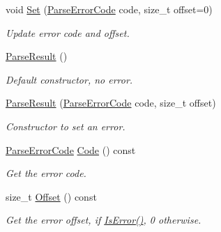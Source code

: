 \begin{DoxyCompactItemize}
void \hyperlink{structParseResult_aa81b4a7b776b77216cb752385203a8c1}{Set} (\hyperlink{group__RAPIDJSON__ERRORS_ga8d4b32dfc45840bca189ade2bbcb6ba7}{Parse\+Error\+Code} code, size\+\_\+t offset=0)
\begin{DoxyCompactList}\small\item\em Update error code and offset. \end{DoxyCompactList}\item 
\mbox{\label{structParseResult_acd4a266f815bec59fa27f64f1923fe9e}} 
\hyperlink{structParseResult_acd4a266f815bec59fa27f64f1923fe9e}{Parse\+Result} ()
\begin{DoxyCompactList}\small\item\em Default constructor, no error. \end{DoxyCompactList}\item 
\mbox{\label{structParseResult_a38ca49a53e80633d0864ad5026adaf84}} 
\hyperlink{structParseResult_a38ca49a53e80633d0864ad5026adaf84}{Parse\+Result} (\hyperlink{group__RAPIDJSON__ERRORS_ga8d4b32dfc45840bca189ade2bbcb6ba7}{Parse\+Error\+Code} code, size\+\_\+t offset)
\begin{DoxyCompactList}\small\item\em Constructor to set an error. \end{DoxyCompactList}\item 
\mbox{\label{structParseResult_a2aae3c2f42b31cc2409ee1e03bc4852e}} 
\hyperlink{group__RAPIDJSON__ERRORS_ga8d4b32dfc45840bca189ade2bbcb6ba7}{Parse\+Error\+Code} \hyperlink{structParseResult_a2aae3c2f42b31cc2409ee1e03bc4852e}{Code} () const
\begin{DoxyCompactList}\small\item\em Get the error code. \end{DoxyCompactList}\item 
\mbox{\label{structParseResult_afbe762766ac21b2aae266105f1dfa643}} 
size\+\_\+t \hyperlink{structParseResult_afbe762766ac21b2aae266105f1dfa643}{Offset} () const
\begin{DoxyCompactList}\small\item\em Get the error offset, if \hyperlink{structParseResult_adfe0ef5b994e82f8aa9ebf0b30c924b1}{Is\+Error()}, 0 otherwise. \end{DoxyCompactList}\item 

\end{DoxyCompactItemize}
